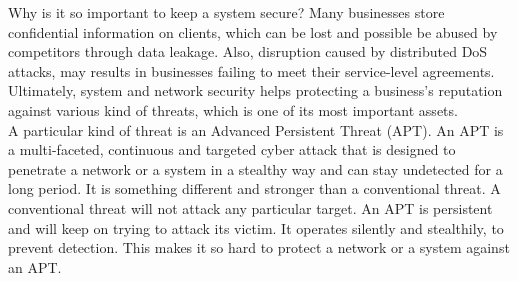 Why is it so important to keep a system secure?  Many businesses store confidential information on clients, which can be lost and possible be abused by competitors through data leakage. Also, disruption caused by distributed DoS attacks, may results in businesses failing to meet their service-level agreements. Ultimately, system and network security helps protecting a business's reputation against various kind of threats, which is one of its most important assets. \\

A particular kind of threat is an Advanced Persistent Threat (APT). An APT is a multi-faceted, continuous and targeted cyber attack that is designed to penetrate a network or a system in a stealthy way and can stay undetected for a long period. It is something different and stronger than a conventional threat. A conventional threat will not attack any particular target. An APT is persistent and will keep on trying to attack its victim. It operates silently and stealthily, to prevent detection. This makes it so hard to protect a network or a system against an APT. 



